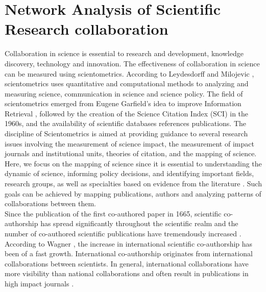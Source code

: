 \section{Network Analysis of Scientific Research collaboration}
Collaboration in science is essential to research and development, knowledge discovery, technology and innovation. 
The effectiveness of collaboration in science can be measured using scientometrics. According to Leydesdorff and Milojevic \cite{leydesdorff_scientometrics_2012}, scientometrics uses quantitative and computational methods to analyzing and measuring science, communication in science and science policy. %
The field of scientometrics emerged from Eugene Garfield’s idea to improve Information Retrieval \cite{eugene_citation_1979}, followed by the creation of the Science Citation Index (SCI) in the 1960s, and the availability of scientific databases references publications. The discipline of Scientometrics is aimed at providing guidance to several research issues involving the measurement of science impact, the measurement of impact journals and institutional units, theories of citation, and the mapping of science. Here, we focus on the mapping of science since it is essential to understanding the dynamic of science, informing policy decisions, and identifying important fields, research groups, as well as specialties based on evidence from the literature \cite{leydesdorff_scientometrics_2012}. Such goals can be achieved by mapping publications, authors and analyzing patterns of collaborations between them.\\
Since the publication of the first co-authored paper in 1665, scientific co-authorship has spread significantly throughout the scientific realm and the number of co-authored scientific publications have tremendously increased \cite{luukkonen_understanding_1992}. According to Wagner \cite{wagner_six_2005}, the increase in international scientific co-authorship has been of a fast growth. International co-authorship originates from international collaborations between scientists. In general, international collaborations have more visibility than national collaborations and often result in publications in high impact journals \cite{glanzel_analysing_2004}.\\
